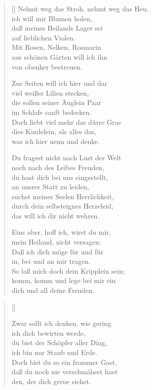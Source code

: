 \begin{multicols}{2}
\begin{verse}[\versewidth]
 Nehmt weg das Stroh, nehmt weg das Heu,\\
ich will mir Blumen holen,\\
daß meines Heilands Lager sei\\
auf lieblichen Violen.\\
Mit Rosen, Nelken, Rosmarin\\
aus schönen Gärten will ich ihn\\
von obenher bestreuen.
 
 Zur Seiten will ich hier und dar\\
viel weißer Lilien stecken,\\
die sollen seiner Äuglein Paar\\
im Schlafe sanft bedecken.\\
Doch liebt viel mehr das dürre Gras\\
dies Kindelein, als alles das,\\
was ich hier nenn und denke.
 
 Du fragest nicht nach Lust der Welt\\
noch nach des Leibes Freuden,\\
du hast dich bei uns eingestellt,\\
an unsrer Statt zu leiden,\\
suchst meiner Seelen Herrlichkeit,\\
durch dein selbsteignes Herzeleid,\\
das will ich dir nicht wehren.
 
 Eins aber, hoff ich, wirst du mir,\\
mein Heiland, nicht versagen:\\
Daß ich dich möge für und für\\
in, bei und an mir tragen.\\
So laß mich doch dein Kripplein sein;\\
komm, komm und lege bei mir ein\\
dich und all deine Freuden.

\end{verse}
\end{multicols}


\begin{center}
\settowidth{\versewidth}{Zwar sollt ich denken, wie gering,}
\begin{verse}[\versewidth]

 Zwar sollt ich denken, wie gering\\
ich dich bewirten werde,\\
du bist der Schöpfer aller Ding,\\
ich bin nur Staub und Erde.\\
Doch bist du so ein frommer Gast,\\
daß du noch nie verschmähest hast\\
den, der dich gerne siehet.

  
\end{verse}
\end{center}



